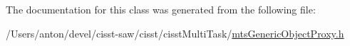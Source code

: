 The documentation for this class was generated from the following file\+:\begin{DoxyCompactItemize}
\item 
/\+Users/anton/devel/cisst-\/saw/cisst/cisst\+Multi\+Task/\hyperlink{mts_generic_object_proxy_8h}{mts\+Generic\+Object\+Proxy.\+h}\end{DoxyCompactItemize}
